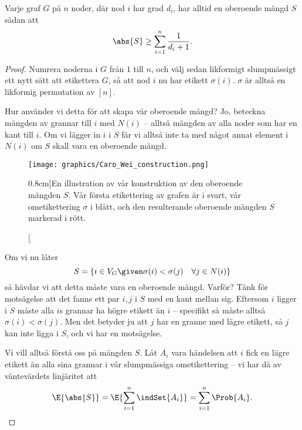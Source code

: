 \documentclass[nobib]{tufte-handout}
\begin{document}
\begin{theorem}
    Varje graf $G$ på $n$ noder, där nod $i$ har grad $d_i$, har alltid en oberoende mängd $S$ sådan att
    $$\abs{S} \geq \sum_{i=1}^{n} \frac{1}{d_i + 1}.$$

    \begin{proof}
        Numrera noderna i $G$ från $1$ till $n$, och välj sedan likformigt slumpmässigt ett nytt sätt att etikettera $G$, så att nod $i$ nu har etikett $\sigma(i)$. $\sigma$ är alltså en likformig permutation av $[n]$.

        Hur använder vi detta för att skapa vår oberoende mängd? Jo, beteckna mängden av grannar till $i$ med $N(i)$ -- alltså mängden av alla noder som har en kant till $i$. Om vi lägger in $i$ i $S$ får vi alltså inte ta med något annat element i $N(i)$ om $S$ skall vara en oberoende mängd.
        
        \begin{figure}
            \centering
            \texttt{[image: graphics/Caro\_Wei\_construction.png]}
            \caption[][0.8cm]{En illustration av vår konstruktion av den oberoende mängden $S$. Vår första etikettering av grafen är i svart, vår ometikettering $\sigma$ i blått, och den resulterande oberoende mängden $S$ markerad i rött.}
        \end{figure}

        Om vi nu låter
        $$S = \left\{i \in V_G \given \sigma(i) < \sigma(j)\quad \forall j \in N(i)\right\}$$
        så hävdar vi att detta måste vara en oberoende mängd. Varför? Tänk för motsägelse att det fanns ett par $i, j$ i $S$ med en kant mellan sig. Eftersom $i$ ligger i $S$ måste alla $i$s grannar ha högre etikett än $i$ -- specifikt så måste alltså $\sigma(i) < \sigma(j)$. Men det betyder ju att $j$ har en granne med lägre etikett, så $j$ kan inte ligga i $S$, och vi har en motsägelse.

        Vi vill alltså förstå oss på mängden $S$. Låt $A_i$ vara händelsen att $i$ fick en lägre etikett än alla sina grannar i vår slumpmässiga ometikettering -- vi har då av väntevärdets linjäritet att
        $$\E{\abs{S}} = \E{\sum_{i=1}^{n} \indSet{A_i}} = \sum_{i=1}^{n} \Prob{A_i}.$$
        

\end{proof}
\end{theorem}
\end{document}
